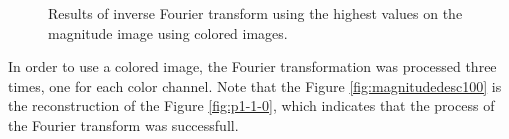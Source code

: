 \documentclass[12pt,a4paper]{article}
\begin{document}
\begin{figure}[!h]
{{		}
		\label{fig:magnitudedesc50}
	}
	\quad
	\quad
	
	\caption{Results of inverse Fourier transform using the highest values on the magnitude image using colored images.}
	\label{fig:magnitudeDESCColored}
\end{figure}

In order to use a colored image, the Fourier transformation was processed three times, one for each color channel. Note that the Figure \ref{fig:magnitudedesc100} is the reconstruction of the Figure \ref{fig:p1-1-0}, which indicates that the process of the Fourier transform was successfull.

\newpage
\end{document}
